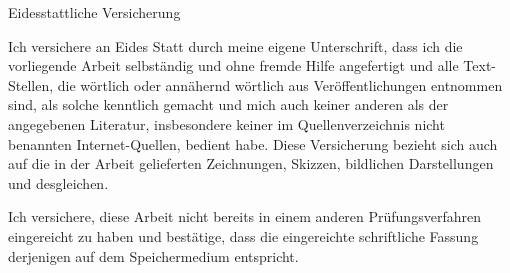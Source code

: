 \documentclass[12pt,headsepline,a4paper]{scrartcl}
\begin{document}
\newpage
Eidesstattliche Versicherung

Ich versichere an Eides Statt durch meine eigene Unterschrift, dass ich die vorliegende Arbeit
selbständig und ohne fremde Hilfe angefertigt und alle Text-Stellen, die wörtlich oder
annähernd wörtlich aus Veröffentlichungen entnommen sind, als solche kenntlich gemacht
und mich auch keiner anderen als der angegebenen Literatur, insbesondere keiner im
Quellenverzeichnis nicht benannten Internet-Quellen, bedient habe. Diese Versicherung
bezieht sich auch auf die in der Arbeit gelieferten Zeichnungen, Skizzen, bildlichen
Darstellungen und desgleichen.

Ich versichere, diese Arbeit nicht bereits in einem anderen Prüfungsverfahren eingereicht zu
haben und bestätige, dass die eingereichte schriftliche Fassung derjenigen auf dem
Speichermedium entspricht.
\end{document}

